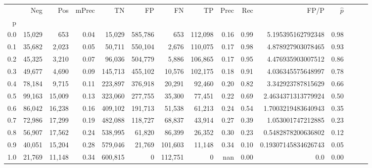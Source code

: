 \begin{tabular}{rrrrrrrrrrrrrrr}
\toprule
{} &     Neg &     Pos & mPrec &       TN &       FP &       FN &       TP &  Prec &   Rec &                 FP/P & $\hat{p}$ \\
p   &         &         &       &          &          &          &          &       &       &                      &           \\
\midrule
0.0 &  15,029 &     653 &  0.04 &   15,029 &  585,786 &      653 &  112,098 &  0.16 &  0.99 &    5.195395162792348 &      0.98 \\
0.1 &  35,682 &   2,023 &  0.05 &   50,711 &  550,104 &    2,676 &  110,075 &  0.17 &  0.98 &    4.878927903078465 &      0.93 \\
0.2 &  45,325 &   3,210 &  0.07 &   96,036 &  504,779 &    5,886 &  106,865 &  0.17 &  0.95 &    4.476935903007512 &      0.86 \\
0.3 &  49,677 &   4,690 &  0.09 &  145,713 &  455,102 &   10,576 &  102,175 &  0.18 &  0.91 &    4.036345575648997 &      0.78 \\
0.4 &  78,184 &   9,715 &  0.11 &  223,897 &  376,918 &   20,291 &   92,460 &  0.20 &  0.82 &    3.342923787815629 &      0.66 \\
0.5 &  99,163 &  15,009 &  0.13 &  323,060 &  277,755 &   35,300 &   77,451 &  0.22 &  0.69 &   2.4634371313779924 &      0.50 \\
0.6 &  86,042 &  16,238 &  0.16 &  409,102 &  191,713 &   51,538 &   61,213 &  0.24 &  0.54 &   1.7003219483640943 &      0.35 \\
0.7 &  72,986 &  17,299 &  0.19 &  482,088 &  118,727 &   68,837 &   43,914 &  0.27 &  0.39 &    1.053001747212885 &      0.23 \\
0.8 &  56,907 &  17,562 &  0.24 &  538,995 &   61,820 &   86,399 &   26,352 &  0.30 &  0.23 &   0.5482878200636802 &      0.12 \\
0.9 &  40,051 &  15,204 &  0.28 &  579,046 &   21,769 &  101,603 &   11,148 &  0.34 &  0.10 &  0.19307145834626743 &      0.05 \\
1.0 &  21,769 &  11,148 &  0.34 &  600,815 &        0 &  112,751 &        0 &   nan &  0.00 &                  0.0 &      0.00 \\
\bottomrule
\end{tabular}
